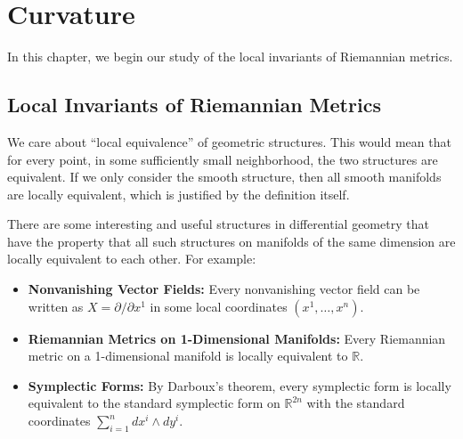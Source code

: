 \documentclass[../main.tex]{subfiles}
\begin{document}
\chapter{Curvature}

In this chapter, we begin our study of the local invariants of Riemannian metrics.

\section{Local Invariants of Riemannian Metrics}
We care about ``local equivalence'' of geometric structures. This would mean that for every point, in some sufficiently small neighborhood, the two structures are equivalent. If we only consider the smooth structure, then all smooth manifolds are locally equivalent, which is justified by the definition itself.

There are some interesting and useful structures in differential geometry that have the property that all such structures on manifolds of the same dimension are locally equivalent to each other. For example:
\begin{itemize}
	\item \textbf{Nonvanishing Vector Fields:} Every nonvanishing vector field can be written as $X = \partial / \partial x^1$ in some local coordinates $(x^1, \ldots, x^n)$.
	\item \textbf{Riemannian Metrics on 1-Dimensional Manifolds:} Every Riemannian metric on a 1-dimensional manifold is locally equivalent to $\mathbb{R}$.
	\item \textbf{Symplectic Forms:} By Darboux's theorem, every symplectic form is locally equivalent to the standard symplectic form on $\mathbb{R}^{2n}$ with the standard coordinates $\sum_{i=1}^n dx^i \wedge dy^i$.
\end{itemize}
\end{document}
